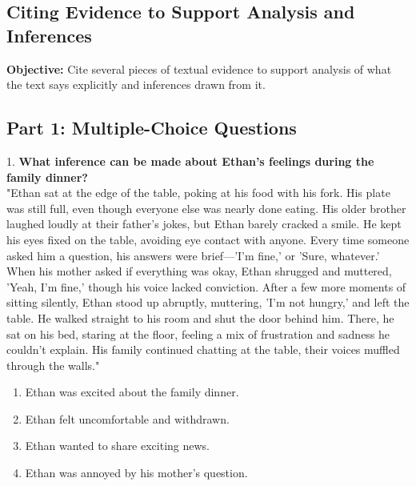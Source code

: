 \documentclass[12pt]{article}
\begin{document}
\subsection*{Citing Evidence to Support Analysis and Inferences}
\onehalfspacing

\begin{tcolorbox}[colframe=black!40, colback=gray!0, title=Learning Objective]
\textbf{Objective:} Cite several pieces of textual evidence to support analysis of what the text says explicitly and inferences drawn from it.
\end{tcolorbox}

\subsection*{Part 1: Multiple-Choice Questions}

1. \textbf{What inference can be made about Ethan's feelings during the family dinner?}\\
"Ethan sat at the edge of the table, poking at his food with his fork. His plate was still full, even though everyone else was nearly done eating. His older brother laughed loudly at their father’s jokes, but Ethan barely cracked a smile. He kept his eyes fixed on the table, avoiding eye contact with anyone. Every time someone asked him a question, his answers were brief—'I’m fine,' or 'Sure, whatever.' When his mother asked if everything was okay, Ethan shrugged and muttered, 'Yeah, I’m fine,' though his voice lacked conviction. After a few more moments of sitting silently, Ethan stood up abruptly, muttering, 'I’m not hungry,' and left the table. He walked straight to his room and shut the door behind him. There, he sat on his bed, staring at the floor, feeling a mix of frustration and sadness he couldn’t explain. His family continued chatting at the table, their voices muffled through the walls."  
\begin{enumerate}[label=\Alph*.]
    \item Ethan was excited about the family dinner.  
    \item Ethan felt uncomfortable and withdrawn.  
    \item Ethan wanted to share exciting news.  
    \item Ethan was annoyed by his mother’s question.  
\end{enumerate}
\end{document}
